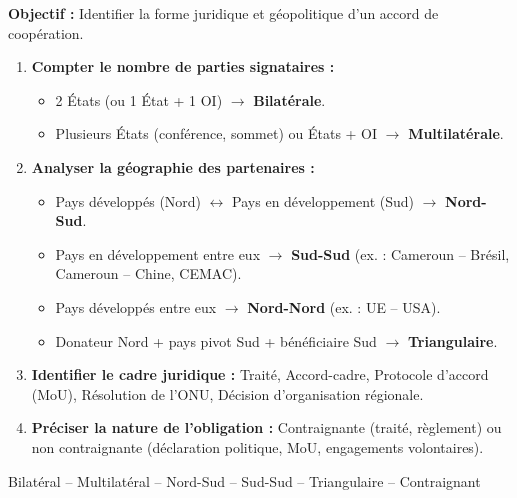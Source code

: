 \documentclass[11pt]{article}
\newcommand{\cle}[1]{{\popxbold\color{popdark}#1}}
\begin{document}
\begin{methode}
\textbf{Objectif :} Identifier la forme juridique et géopolitique d'un accord de coopération.
\begin{enumerate}
    \item \textbf{Compter le nombre de parties signataires :}
    \begin{itemize}
        \item 2 États (ou 1 État + 1 OI) $\rightarrow$ \textbf{Bilatérale}.
        \item Plusieurs États (conférence, sommet) ou États + OI $\rightarrow$ \textbf{Multilatérale}.
    \end{itemize}
    \item \textbf{Analyser la géographie des partenaires :}
    \begin{itemize}
        \item Pays développés (Nord) $\leftrightarrow$ Pays en développement (Sud) $\rightarrow$ \textbf{Nord-Sud}.
        \item Pays en développement entre eux $\rightarrow$ \textbf{Sud-Sud} (ex. : Cameroun -- Brésil, Cameroun -- Chine, CEMAC).
        \item Pays développés entre eux $\rightarrow$ \textbf{Nord-Nord} (ex. : UE -- USA).
        \item Donateur Nord + pays pivot Sud + bénéficiaire Sud $\rightarrow$ \textbf{Triangulaire}.
    \end{itemize}
    \item \textbf{Identifier le cadre juridique :} Traité, Accord-cadre, Protocole d'accord (MoU), Résolution de l'ONU, Décision d'organisation régionale.
    \item \textbf{Préciser la nature de l'obligation :} Contraignante (traité, règlement) ou non contraignante (déclaration politique, MoU, engagements volontaires).
\end{enumerate}
\cle{Bilatéral} -- \cle{Multilatéral} -- \cle{Nord-Sud} -- \cle{Sud-Sud} -- \cle{Triangulaire} -- \cle{Contraignant}
\end{methode}
\end{document}
